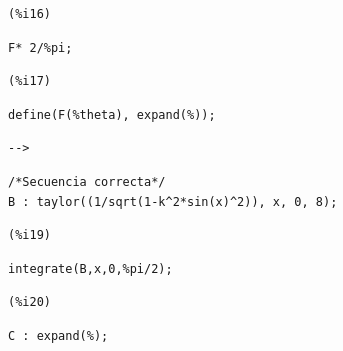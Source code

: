\documentclass[12pt]{article}
\begin{document}
\noindent
\begin{minipage}[t]{8ex}{\color{red}\bf
\begin{verbatim}
(%i16) 
\end{verbatim}}
\end{minipage}
\begin{minipage}[t]{\textwidth}{\color{blue}
\begin{verbatim}
F* 2/%pi;
\end{verbatim}}
\end{minipage}

\noindent
\begin{minipage}[t]{8ex}{\color{red}\bf
\begin{verbatim}
(%i17) 
\end{verbatim}}
\end{minipage}
\begin{minipage}[t]{\textwidth}{\color{blue}
\begin{verbatim}
define(F(%theta), expand(%));
\end{verbatim}}
\end{minipage}

\noindent
\begin{minipage}[t]{8ex}{\color{red}\bf
\begin{verbatim}
-->  
\end{verbatim}}
\end{minipage}
\begin{minipage}[t]{\textwidth}{\color{blue}
\begin{verbatim}
/*Secuencia correcta*/
B : taylor((1/sqrt(1-k^2*sin(x)^2)), x, 0, 8);
\end{verbatim}}
\end{minipage}

\noindent
\begin{minipage}[t]{8ex}{\color{red}\bf
\begin{verbatim}
(%i19) 
\end{verbatim}}
\end{minipage}
\begin{minipage}[t]{\textwidth}{\color{blue}
\begin{verbatim}
integrate(B,x,0,%pi/2);
\end{verbatim}}
\end{minipage}

\noindent
\begin{minipage}[t]{8ex}{\color{red}\bf
\begin{verbatim}
(%i20) 
\end{verbatim}}
\end{minipage}
\begin{minipage}[t]{\textwidth}{\color{blue}
\begin{verbatim}
C : expand(%);
\end{verbatim}}
\end{minipage}
\end{document}
